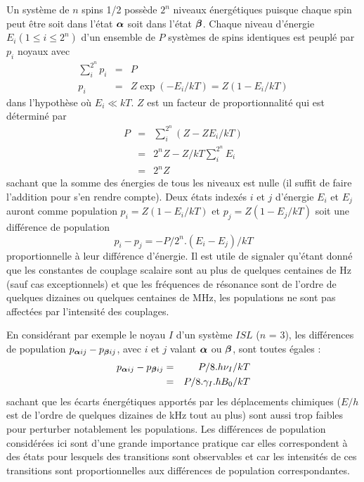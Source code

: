 Un système de $n$ spins 1/2 possède $2^n$ niveaux énergétiques puisque chaque spin
peut être soit dans l'état $\boldsymbol{\alpha}$ soit dans l'état $\boldsymbol{\beta}$.
Chaque niveau d'énergie $E_i (1 \le i \le 2^n)$ d'un ensemble de $P$ systèmes
de spins identiques est peuplé par $p_i$ noyaux avec
\begin{eqnarray}
\sum_i^{2^n} p_i & = & P \\
p_i & = & Z \exp(-E_i/kT) = Z(1 - E_i/kT)
\end{eqnarray}
dans l'hypothèse où $E_i \ll kT$.
$Z$ est un facteur de proportionnalité qui est déterminé par
\begin{eqnarray}
P & = & \sum_i^{2^n} (Z - ZE_i/kT) \\
& = & 2^n Z - Z/kT \sum_i^{2^n} E_i \\
& = & 2^n Z
\end{eqnarray}
sachant que la somme des énergies de tous les niveaux est nulle (il
suffit de faire l'addition pour s'en rendre compte).
Deux états indexés $i$ et $j$ d'énergie $E_i$ et $E_j$ auront comme population
$p_i = Z(1-E_i/kT)$ et $p_j = Z(1-E_j/kT)$ soit une différence de population
\begin{equation}
\label{eqn:diffpop}
p_i - p_j = -P/2^n.(E_i - E_j)/kT
\end{equation}
proportionnelle à leur différence d'énergie.
Il est utile de signaler qu'étant donné que les constantes de couplage
scalaire sont au plus de quelques centaines de Hz (sauf cas exceptionnels)
et que les fréquences de résonance sont de l'ordre de quelques dizaines
ou quelques centaines de MHz, les populations ne sont pas affectées par
l'intensité des couplages.

En considérant par exemple le noyau $I$ d'un système $ISL$ ($n$ = 3),
les différences de population $p_{\boldsymbol{\alpha} i j} -p_{\boldsymbol{\beta} i j}$, avec $i$ et $j$
valant $\boldsymbol{\alpha}$ ou $\boldsymbol{\beta}$, sont toutes égales :
\begin{eqnarray}
p_{\boldsymbol{\alpha} i j} -p_{\boldsymbol{\beta} i j} & = & P/8.h\nu_I/kT \\
& = & P/8.\gamma_I.\hbar B_0/kT
\end{eqnarray}
sachant que les écarts énergétiques apportés par les déplacements chimiques
($E/h$ est de l'ordre de quelques dizaines de kHz tout au plus)
sont aussi trop faibles pour perturber notablement les populations.
Les différences de population considérées ici sont d'une grande importance pratique
car elles correspondent à des états pour lesquels des transitions sont
observables et car les intensités de ces transitions sont proportionnelles
aux différences de population correspondantes.

